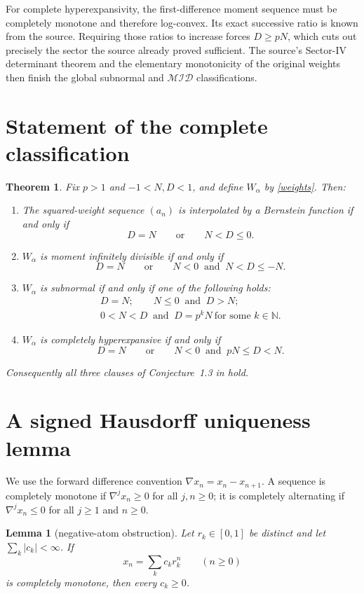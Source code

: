 \documentclass[11pt]{article}
\newtheorem{theorem}{Theorem}
\newtheorem{lemma}{Lemma}
\newcommand{\MID}{\mathcal{MID}}
\newcommand{\Nats}{\mathbb N}
\begin{document}
For complete hyperexpansivity, the first-difference moment sequence must be
completely monotone and therefore log-convex.  Its exact successive ratio is
known from the source.  Requiring those ratios to increase forces $D\geq pN$,
which cuts out precisely the sector the source already proved sufficient.
The source's Sector-IV determinant theorem and the elementary monotonicity of
the original weights then finish the global subnormal and $\MID$
classifications.

\section{Statement of the complete classification}

\begin{theorem}\label{classification}
Fix $p>1$ and $-1<N,D<1$, and define $W_\alpha$ by \eqref{weights}.
Then:
\begin{enumerate}
\item The squared-weight sequence $(a_n)$ is interpolated by a Bernstein
function if and only if
\[
 D=N\qquad\text{or}\qquad N<D\leq0.
\]
\item $W_\alpha$ is moment infinitely divisible if and only if
\[
 D=N\qquad\text{or}\qquad N<0\ \text{ and }\ N<D\leq -N.
\]
\item $W_\alpha$ is subnormal if and only if one of the following holds:
\[
 \begin{gathered}
 D=N;\qquad N\leq0\ \text{ and }\ D>N;\\
 0<N<D\ \text{ and }\ D=p^kN\ \text{for some }k\in\Nats.
 \end{gathered}
\]
\item $W_\alpha$ is completely hyperexpansive if and only if
\[
 D=N\qquad\text{or}\qquad N<0\ \text{ and }\ pN\leq D<N.
\]
\end{enumerate}
Consequently all three clauses of Conjecture~1.3 in \cite{GRWS} hold.
\end{theorem}

\section{A signed Hausdorff uniqueness lemma}

We use the forward difference convention
$\nabla x_n=x_n-x_{n+1}$.  A sequence is completely monotone if
$\nabla^j x_n\geq0$ for all $j,n\geq0$; it is completely alternating if
$\nabla^j x_n\leq0$ for all $j\geq1$ and $n\geq0$.

\begin{lemma}[negative-atom obstruction]\label{negative-atom}
Let $r_k\in[0,1]$ be distinct and let
$\sum_k|c_k|<\infty$.  If
\[
 x_n=\sum_k c_kr_k^n\qquad(n\geq0)
\]
is completely monotone, then every $c_k\geq0$.
\end{lemma}
\end{document}
